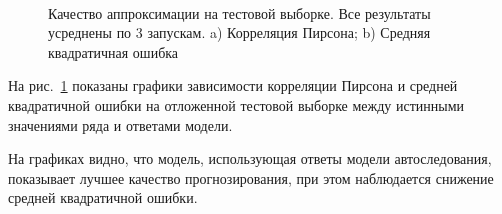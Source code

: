 \begin{figure}[H]\center
{}
\\
\caption{Качество аппроксимации на тестовой выборке. Все результаты усреднены по 3 запускам. a) Корреляция Пирсона; b) Средняя квадратичная ошибка}
\label{transformer_plots}
\end{figure}

На рис.~\ref{transformer_plots} показаны графики зависимости корреляции Пирсона и средней квадратичной ошибки на отложенной тестовой выборке между истинными значениями ряда и ответами модели.

На графиках видно, что модель, использующая ответы модели автоследования, показывает лучшее качество прогнозирования, при этом наблюдается снижение средней квадратичной ошибки. 


